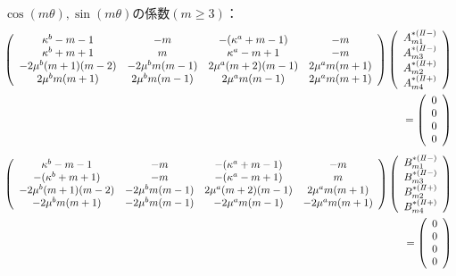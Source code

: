 $\cos(m\theta),\sin(m\theta)$の係数$(m\geq3)$：
\begin{align}
	\left(
	\begin{array}{cccc}
		\kappa^b-m-1& -m & -(\kappa^a+m-1) & -m \\
		\kappa^b+m+1 & m & \kappa^a-m+1 & -m \\
		-2\mu^{b}(m+1)(m-2) & -2\mu^{b}m(m-1) &
		2\mu^{a}(m+2)(m-1) & 2\mu^{a}m(m+1) \\
		2\mu^{b}m(m+1) & 2\mu^{b}m(m-1) &
		2\mu^{a}m(m-1) & 2\mu^{a}m(m+1) \\
	\end{array}
	\right)
	\left(
	\begin{array}{c}
		A_{m1}^{*(I\hspace{-.15em}I-)} \\
	 	A_{m3}^{*(I\hspace{-.15em}I-)} \\
		A_{m2}^{*(I\hspace{-.15em}I+)}\\
	 	A_{m4}^{*(I\hspace{-.15em}I+)} \\
	\end{array}
	\right)
	\nonumber
	\\
	=
	\left(
	\begin{array}{c}
		0 \\
	 	0 \\
		0 \\
	 	0 \\
	\end{array}
	\right)
\end{align}
\begin{align}
	\left(
	\begin{array}{cccc}
		\kappa^b-m-1& -m & -(\kappa^a+m-1) & -m \\
		-(\kappa^b+m+1) & -m & -(\kappa^a-m+1) & m \\
		-2\mu^{b}(m+1)(m-2) & -2\mu^{b}m(m-1) &
		2\mu^{a}(m+2)(m-1) & 2\mu^{a}m(m+1) \\
		-2\mu^{b}m(m+1) & -2\mu^{b}m(m-1) &
		-2\mu^{a}m(m-1) & -2\mu^{a}m(m+1) \\
	\end{array}
	\right)
	\left(
	\begin{array}{c}
		B_{m1}^{*(I\hspace{-.15em}I-)} \\
	 	B_{m3}^{*(I\hspace{-.15em}I-)} \\
		B_{m2}^{*(I\hspace{-.15em}I+)}\\
	 	B_{m4}^{*(I\hspace{-.15em}I+)} \\
	\end{array}
	\right)
	\nonumber
	\\
	=
	\left(
	\begin{array}{c}
		0 \\
	 	0 \\
		0 \\
	 	0 \\
	\end{array}
	\right)
\end{align}


